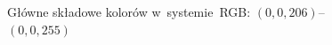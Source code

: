 \documentclass[a4paper,11pt]{article}
\numberwithin{equation}{section}
\begin{document}
\begin{figure}
\begin{tikzpicture}



















  \end{tikzpicture}

  \caption{Główne składowe kolorów w~systemie~RGB: $(0,0,206)$--$(0,0,255)$}



  \label{fig:Basic-colors-Part-11}

\end{figure}
















\end{document}
